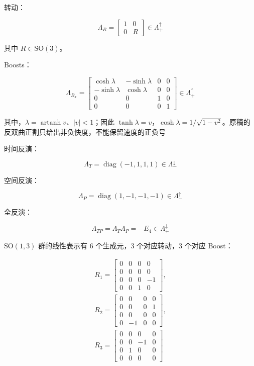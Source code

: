转动：

\begin{equation}
\Lambda_R
=\begin{bmatrix}
1 &0 \\
0 &R
\end{bmatrix} \in \Lambda_+^\uparrow
\end{equation}

其中 $R\in\mathrm{SO}\left(3\right)$。

Boosts：

\begin{equation}
\Lambda_{B_x}
=\begin{bmatrix}
\cosh \lambda &-\sinh \lambda &0 &0 \\
-\sinh \lambda &\cosh\lambda &0 &0 \\
0 &0 &1 &0 \\
0 &0 &0 &1
\end{bmatrix}\in \Lambda_+^\uparrow
\end{equation}

其中，$\lambda=\operatorname{artanh}v$、$|v|<1$；因此 $\tanh\lambda=v$，$\cosh\lambda=1/\sqrt{1-v^2}$。原稿的反双曲正割只给出非负快度，不能保留速度的正负号

时间反演：

\begin{equation}
\Lambda_T=\operatorname{diag}\left(-1,1,1,1\right)\in \Lambda_-^\downarrow
\end{equation}

空间反演：

\begin{equation}
\Lambda_P=\operatorname{diag}\left(1,-1,-1,-1\right)\in \Lambda_-^\uparrow
\end{equation}

全反演：

\begin{equation}
\Lambda_{TP}=\Lambda_T\Lambda_P=-E_4\in \Lambda_+^\downarrow
\end{equation}

$\mathrm{SO}\left(1,3\right)$ 群的线性表示有 $6$ 个生成元，$3$ 个对应转动，$3$ 个对应 Boost：

\begin{gather}
R_1
=\begin{bmatrix}
0 &0 &0 &0 \\
0 &0 &0 &0 \\
0 &0 &0 &-1 \\
0 &0 &1 &0
\end{bmatrix},\\
R_2
=\begin{bmatrix}
0 &0 &0 &0 \\
0 &0 &0 &1 \\
0 &0 &0 &0 \\
0 &-1 &0 &0
\end{bmatrix},\\
R_3
=\begin{bmatrix}
0 &0 &0 &0 \\
0 &0 &-1 &0 \\
0 &1 &0 &0 \\
0 &0 &0 &0
\end{bmatrix}
\end{gather}

